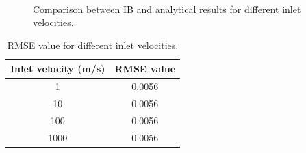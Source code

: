\begin{figure}[H]
	\centering
	\quad
	\\
	\quad
	\caption{Comparison between IB and analytical results for different inlet velocities.}
	\label{fig:C3_penalizationResultInletVelocity}
\end{figure}

\begin{table}[H]
\centering
\begin{tabular}{c | c}
	Inlet velocity (m/s) & RMSE value \\ \hline \hline
	1 & 0.0056 \\ \hline
	10 & 0.0056 \\ \hline
	100 & 0.0056 \\ \hline
	1000 & 0.0056
\end{tabular}
\caption{RMSE value for different inlet velocities.}
\label{table:C3_penalizationResultInletVelocityRMSE}
\end{table}

